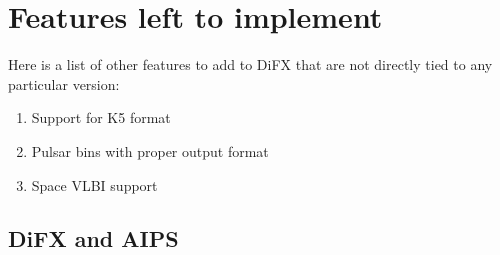 %
%
% 
%
%
%



\section{Features left to implement}

Here is a list of other features to add to DiFX that are not directly tied to any particular version:
\begin{enumerate}
\item Support for K5 format
\item Pulsar bins with proper output format
\item Space VLBI support
\end{enumerate}


\subsection{DiFX and AIPS}

